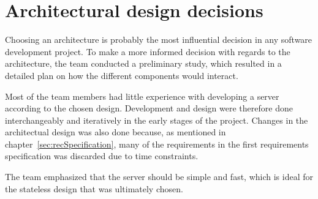 \section{Architectural design decisions}
Choosing an architecture is probably the most influential decision in any software development project. To make a more informed decision with regards to the architecture, the team conducted a preliminary study, which resulted in a detailed plan on how the different components would interact. 

Most of the team members had little experience with developing a server according to the chosen design. Development and design were therefore done interchangeably and iteratively in the early stages of the project. Changes in the architectual design was also done because, as mentioned in chapter~\ref{sec:recSpecification}, many of the requirements in the first requirements specification was discarded due to time constraints.

The team emphasized that the server should be simple and fast, which is ideal for the stateless design that was ultimately chosen.